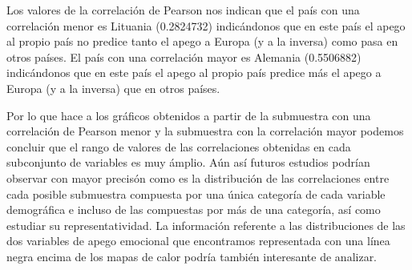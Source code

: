 \documentclass{article}
\begin{document}
\noindent Los valores de la correlación de Pearson nos indican que el país con una correlación menor es Lituania (0.2824732) indicándonos que en este país el apego al propio país no predice tanto el apego a Europa (y a la inversa) como pasa en otros países. El país con una correlación mayor es Alemania (0.5506882) indicándonos que en este país el apego al propio país predice más el apego a Europa (y a la inversa) que en otros países.


\noindent Por lo que hace a los gráficos obtenidos a partir de la submuestra con una correlación de Pearson menor y la submuestra con la correlación mayor podemos concluir que el rango de valores de las correlaciones obtenidas en cada subconjunto de variables es muy ámplio. Aún así futuros estudios podrían observar con mayor precisón como es la distribución de las correlaciones entre cada posible submuestra compuesta por una única categoría de cada variable demográfica e incluso de las compuestas por más de una categoría, así como estudiar su representatividad. La información referente a las distribuciones de las dos variables de apego emocional que encontramos representada con una línea negra encima de los mapas de calor podría también interesante de analizar.
\end{document}
